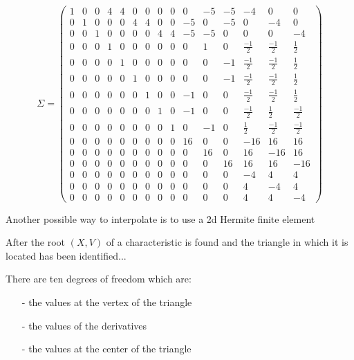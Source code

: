 \documentclass[proc]{edpsmath}
\begin{document}
\begin{equation*}
\Sigma = 
\begin{pmatrix}
	1 & 0 & 0 & 4 & 4 & 0 & 0 & 0 & 0 & 0 & -5 & -5 & -4 & 0 & 0  \\
	0 & 1 & 0 & 0 & 0 & 4 & 4 & 0 & 0 & -5 & 0 & -5 & 0 & -4 & 0  \\
	0 & 0 & 1 & 0 & 0 & 0 & 0 & 4 & 4 & -5 & -5 & 0 & 0 & 0 & -4  \\
	0 & 0 & 0 & 1 & 0 & 0 & 0 & 0 & 0 & 0 & 1 & 0 & \frac{-1}{2} & \frac{-1}{2} & \frac{1}{2}  \\
	0 & 0 & 0 & 0 & 1 & 0 & 0 & 0 & 0 & 0 & 0 & -1 & \frac{-1}{2} & \frac{-1}{2} & \frac{1}{2}  \\
	0 & 0 & 0 & 0 & 0 & 1 & 0 & 0 & 0 & 0 & 0 & -1 & \frac{-1}{2} & \frac{-1}{2} & \frac{1}{2}  \\
	0 & 0 & 0 & 0 & 0 & 0 & 1 & 0 & 0 & -1 & 0 & 0 & \frac{-1}{2} & \frac{-1}{2} & \frac{1}{2}  \\
	0 & 0 & 0 & 0 & 0 & 0 & 0 & 1 & 0 & -1 & 0 & 0 & \frac{-1}{2} & \frac{1}{2} & \frac{-1}{2}  \\
	0 & 0 & 0 & 0 & 0 & 0 & 0 & 0 & 1 & 0 & -1 & 0 & \frac{1}{2} & \frac{-1}{2} & \frac{-1}{2}  \\
	0 & 0 & 0 & 0 & 0 & 0 & 0 & 0 & 0 & 16 & 0 & 0 &-16 & 16 & 16 \\
	0 & 0 & 0 & 0 & 0 & 0 & 0 & 0 & 0 & 0 & 16 & 0 & 16 &-16 & 16 \\
	0 & 0 & 0 & 0 & 0 & 0 & 0 & 0 & 0 & 0 & 0 & 16 & 16 & 16 &-16 \\
	0 & 0 & 0 & 0 & 0 & 0 & 0 & 0 & 0 & 0 & 0 & 0 &-4 & 4 & 4  \\
	0 & 0 & 0 & 0 & 0 & 0 & 0 & 0 & 0 & 0 & 0 & 0 & 4 &-4 & 4  \\
	0 & 0 & 0 & 0 & 0 & 0 & 0 & 0 & 0 & 0 & 0 & 0 & 4 & 4 &-4  
\end{pmatrix}
\end{equation*}

Another possible way to interpolate is to use a 2d Hermite finite element \cite{zie}   

After the root $(X,V)$ of a characteristic is found and  the triangle in which it is located has been identified... 

There are ten degrees of freedom which are:
\begin{itemize}
\item[-] the values at the vertex of the triangle 
\item[-] the values of the derivatives 
\item[-] the values at the center of the triangle 
\end{itemize}
\end{document}
